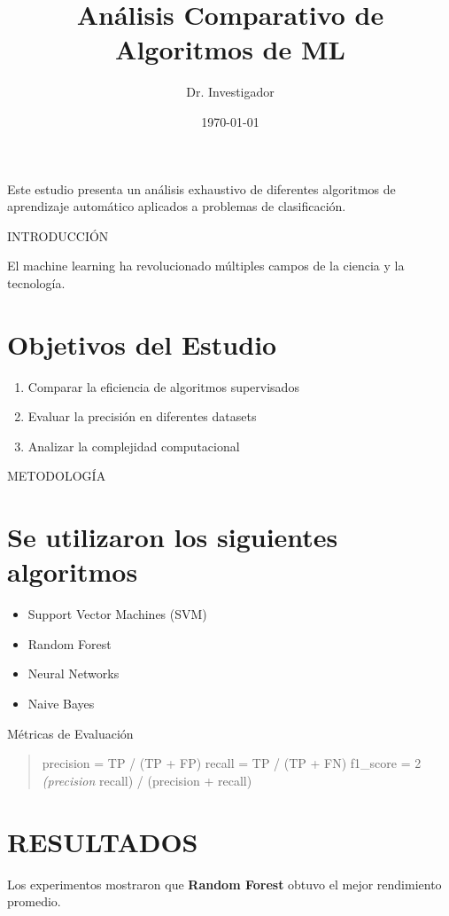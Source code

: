 \documentclass[12pt,a4paper]{article}
\title{Análisis Comparativo de Algoritmos de ML}
\author{Dr. Investigador}
\date{\today}
\begin{document}
\maketitle
\tableofcontents
\newpage


Este estudio presenta un análisis exhaustivo de diferentes algoritmos de aprendizaje automático aplicados a problemas de clasificación.


INTRODUCCIÓN

El machine learning ha revolucionado múltiples campos de la ciencia y la tecnología.


\section{Objetivos del Estudio}

\begin{enumerate}
\item Comparar la eficiencia de algoritmos supervisados
\item Evaluar la precisión en diferentes datasets
\item Analizar la complejidad computacional
\end{enumerate}


METODOLOGÍA

\section{Se utilizaron los siguientes algoritmos}

\begin{itemize}
\item Support Vector Machines (SVM)
\item Random Forest
\item Neural Networks
\item Naive Bayes
\end{itemize}


Métricas de Evaluación

\begin{quote}
precision = TP / (TP + FP)
recall = TP / (TP + FN)
f1\_score = 2 \textit{ (precision } recall) / (precision + recall)
\end{quote}


\section{RESULTADOS}

Los experimentos mostraron que \textbf{Random Forest} obtuvo el mejor rendimiento promedio.
\end{document}
